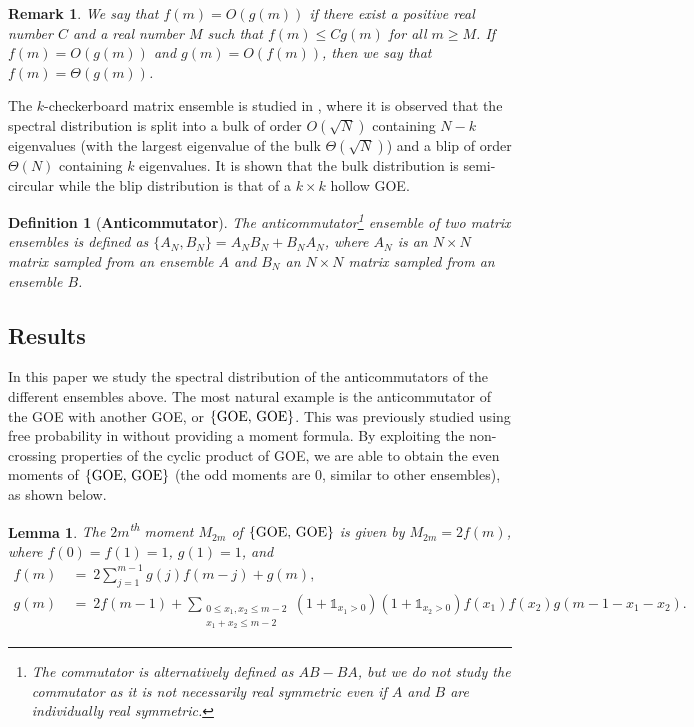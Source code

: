 \documentclass[11pt,reqno]{amsart}
\numberwithin{equation}{section}
\theoremstyle{plain}
\newtheorem{definition}[thm]{Definition}
\newtheorem{lemma}[thm]{Lemma}
\newtheorem{remark}[thm]{Remark}
\begin{document}
\begin{remark}
We say that $f(m)=O(g(m))$ if there exist a positive real number $C$ and a real number $M$ such that $f(m)\leq Cg(m)$ for all $m\geq M$. If $f(m)=O(g(m))$ and $g(m)=O(f(m))$, then we say that $f(m)=\Theta(g(m))$.
\end{remark}

The $k$-checkerboard matrix ensemble is studied in \cite{split}, where it is observed that the spectral distribution is split into a bulk of order $O(\sqrt{N})$ containing $N-k$ eigenvalues (with the largest eigenvalue of the bulk $\Theta(\sqrt{N})$) and a blip of order $\Theta(N)$ containing $k$ eigenvalues. It is shown that the bulk distribution is semi-circular while the blip distribution is that of a $k\times k$ hollow GOE.

\begin{definition}[\textbf{Anticommutator}]
The anticommutator\footnote{The commutator is alternatively defined as $AB-BA$, but we do not study the commutator as it is not necessarily real symmetric even if $A$ and $B$ are individually real symmetric.} ensemble of two matrix ensembles is defined as $\{A_N,B_N\}=A_NB_N+B_NA_N$, where $A_N$ is an $N\times N$ matrix sampled from an ensemble $A$ and $B_N$ an $N\times N$ matrix sampled from an ensemble $B$.
\end{definition}

\subsection{Results}
In this paper we study the spectral distribution of the anticommutators of the different ensembles above. The most natural example is the anticommutator of the GOE with another GOE, or $\{\textup{GOE, GOE}\}$. This was previously studied using free probability in \cite{commutator} without providing a moment formula. By exploiting the non-crossing properties of the cyclic product of GOE, we are able to obtain the even moments of $\{\textup{GOE, GOE}\}$ (the odd moments are 0, similar to other ensembles), as shown below.

\begin{lemma}\label{GOE-GOE moment recurrence intro}
The $2m$\textsuperscript{th} moment $M_{2m}$ of $\{\textup{GOE, GOE}\}$ is given by $M_{2m}=2f(m)$, where $f(0)=f(1)=1$, $g(1)=1$, and
\begin{align}
f(m) &\ = \ 2\sum_{j=1}^{m-1}g(j)f(m-j) + g(m), \\
g(m) &\ = \ 2f(m-1) + \sum_{\substack{0\leq x_1,x_2\leq m-2\\ x_1+x_2\leq m-2}}(1+\mathbb{1}_{x_1>0})(1+\mathbb{1}_{x_2>0})f(x_1)f(x_2)g(m-1-x_1-x_2).
\end{align}
\end{lemma}
\end{document}
